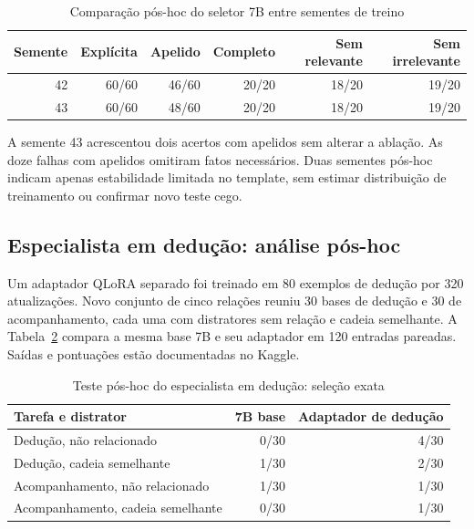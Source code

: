 \documentclass[12pt,a4paper]{article}
\begin{document}
\begin{table}[htbp]\centering\caption{Comparação pós-hoc do seletor 7B entre sementes de treino}\label{tab:seed-7b}\begin{tabular}{rrrrrr}\toprule Semente & Explícita & Apelido & Completo & Sem relevante & Sem irrelevante\\\midrule 42 & 60/60 & 46/60 & 20/20 & 18/20 & 19/20\\ 43 & 60/60 & 48/60 & 20/20 & 18/20 & 19/20\\ \bottomrule\end{tabular}\par{}\end{table}

A semente 43 acrescentou dois acertos com apelidos sem alterar a ablação. As doze falhas com apelidos omitiram fatos necessários. Duas sementes pós-hoc indicam apenas estabilidade limitada no template, sem estimar distribuição de treinamento ou confirmar novo teste cego.

\subsection{Especialista em dedução: análise pós-hoc}
Um adaptador QLoRA separado foi treinado em 80 exemplos de dedução por 320 atualizações. Novo conjunto de cinco relações reuniu 30 bases de dedução e 30 de acompanhamento, cada uma com distratores sem relação e cadeia semelhante. A Tabela~\ref{tab:deduction-specialist} compara a mesma base 7B e seu adaptador em 120 entradas pareadas. Saídas e pontuações estão documentadas no Kaggle.

\begin{table}[htbp]\centering\caption{Teste pós-hoc do especialista em dedução: seleção exata}\label{tab:deduction-specialist}\begin{tabular}{lrr}\toprule Tarefa e distrator & 7B base & Adaptador de dedução\\\midrule Dedução, não relacionado & 0/30 & 4/30\\Dedução, cadeia semelhante & 1/30 & 2/30\\Acompanhamento, não relacionado & 1/30 & 1/30\\Acompanhamento, cadeia semelhante & 0/30 & 1/30\\ \bottomrule\end{tabular}\par{}\end{table}
\end{document}
